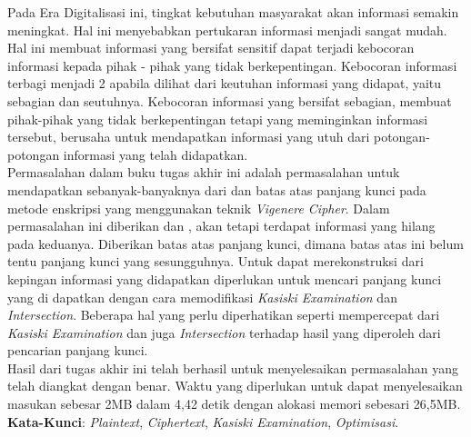 \begin{abstrak}
		\indent Pada Era Digitalisasi ini, tingkat kebutuhan masyarakat akan informasi semakin meningkat. Hal ini menyebabkan pertukaran informasi menjadi sangat mudah. Hal ini membuat informasi yang bersifat sensitif dapat terjadi kebocoran informasi kepada pihak - pihak yang tidak berkepentingan. Kebocoran informasi terbagi menjadi 2 apabila dilihat dari keutuhan informasi yang didapat, yaitu sebagian dan seutuhnya. Kebocoran informasi yang bersifat sebagian, membuat pihak-pihak yang tidak berkepentingan tetapi yang meminginkan informasi tersebut, berusaha untuk mendapatkan informasi yang utuh dari potongan-potongan informasi yang telah didapatkan. 
\\
\indent Permasalahan dalam buku tugas akhir ini adalah permasalahan untuk mendapatkan \plaintext sebanyak-banyaknya dari \ciphertext dan batas atas panjang kunci pada metode enskripsi yang menggunakan teknik \textit{Vigenere Cipher}. Dalam permasalahan ini diberikan \plaintext dan \ciphertext, akan tetapi terdapat informasi yang hilang pada keduanya. Diberikan batas atas panjang kunci, dimana batas atas ini belum tentu panjang kunci yang sesungguhnya. Untuk dapat merekonstruksi \plaintext dari kepingan informasi yang didapatkan diperlukan untuk mencari panjang kunci yang di dapatkan dengan cara memodifikasi \textit{Kasiski Examination} dan \textit{Intersection}. Beberapa hal yang perlu diperhatikan seperti mempercepat dari \textit{Kasiski Examination} dan juga \textit{Intersection} terhadap hasil yang diperoleh dari pencarian panjang kunci.
\\  
\indent Hasil dari tugas akhir ini telah berhasil untuk menyelesaikan permasalahan yang telah diangkat dengan benar. Waktu yang diperlukan untuk dapat menyelesaikan masukan sebesar 2MB dalam 4,42 detik dengan alokasi memori sebesari 26,5MB.
\\
\noindent \textbf{Kata-Kunci}:  \textit{Plaintext}, \textit{Ciphertext}, \textit{Kasiski Examination},  \textit{Optimisasi}.
\end{abstrak}


